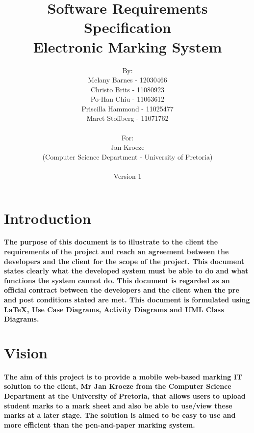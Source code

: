\documentclass[12pt]{article}
\begin{document}
\title{Software Requirements Specification\\
Electronic Marking System}
\author{By: \\ Melany Barnes - 12030466 \\ Christo Brits - 11080923 \\ Po-Han Chiu - 11063612 \\ Priscilla Hammond - 11025477 \\  Maret Stoffberg - 11071762 \\ \\ For: \\ Jan Kroeze \\ (Computer Science Department - University of Pretoria) \\ \\ Version 1 \\}
  \maketitle   \pagebreak
  \tableofcontents
  \pagebreak
  \section{Introduction}
  \paragraph*{The purpose of this document is to illustrate to the client the requirements of the project and reach an agreement between the developers and the client for the scope of the project. This document states clearly what the developed system must be able to do and what functions the system cannot do. This document is regarded as an official contract between the developers and the client when the pre and post conditions stated are met. This document is formulated using LaTeX, Use Case Diagrams, Activity Diagrams and UML Class Diagrams.}
  \section{Vision}
  \paragraph*{The aim of this project is to provide a mobile web-based marking IT solution to the client, Mr Jan Kroeze from the Computer Science Department at the University of Pretoria, that allows users to upload student marks to a mark sheet and also be able to use/view these marks at a later stage. The solution is aimed to be easy to use and more efficient than the pen-and-paper marking system.}
\end{document}
